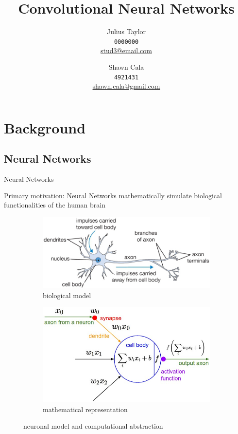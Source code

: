 \documentclass[12pt]{beamer}
\title{Convolutional Neural Networks}
\author{
\linebreak
Julius Taylor \\ \texttt{0000000} \\ \href{mailto:stud3@email.com}{stud3@email.com}
 \and   
 \linebreak
Shawn Cala \\ \texttt{4921431} \\ \href{mailto:shawn.cala@gmail.com}{shawn.cala@gmail.com}
}
\begin{document}
\begin{frame}
\titlepage
\end{frame}
\section{Background}
\subsection{Neural Networks}
\begin{frame}{Neural Networks}

Primary motivation: Neural Networks mathematically simulate biological functionalities of the human brain
\begin{figure}
\begin{subfigure}{.5\textwidth}
  \centering
  \includegraphics[width=\linewidth,height=0.35\textheight]{images/neuron.png}
  \caption{biological model}
  \label{fig:sub1}
\end{subfigure}%
\begin{subfigure}{.5\textwidth}
  \centering
  \includegraphics[width=\linewidth,height=0.35\textheight]{images/neuron_model.jpeg}
  \caption{mathematical representation}
  \label{fig:sub2}
\end{subfigure}
\caption{neuronal model and computational abstraction}
\label{fig:abstract}
\end{figure}

\end{frame}
\end{document}

